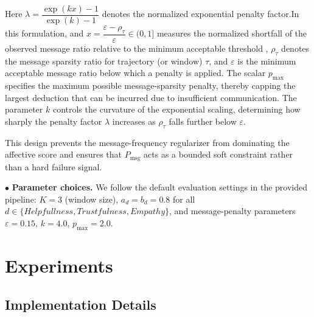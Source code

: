 \documentclass{article}
\theoremstyle{plain}
\theoremstyle{definition}
\theoremstyle{remark}
\begin{document}
Here $\lambda = \dfrac{\exp(kx)-1}{\exp(k)-1}$ denotes the normalized exponential penalty factor.In this formulation, and $x=\dfrac{\varepsilon-\rho_{\tau}}{\varepsilon}\in(0,1]$ measures the normalized shortfall of the observed message ratio relative to the minimum acceptable threshold
, $\rho_{\tau}$ denotes the message sparsity ratio for trajectory (or window) $\tau$, and $\varepsilon$ is the minimum acceptable message ratio below which a penalty is applied. The scalar $p_{\max}$ specifies the maximum possible message-sparsity penalty, thereby capping the largest deduction that can be incurred due to insufficient communication. The parameter $k$ controls the curvature of the exponential scaling, determining how sharply the penalty factor $\lambda$ increases as $\rho_{\tau}$ falls further below $\varepsilon$.

This design prevents the message-frequency regularizer from dominating the affective score and ensures that $P_{\mathrm{msg}}$ acts as a bounded soft constraint rather than a hard failure signal.


$\bullet$ \textbf{Parameter choices.}
We follow the default evaluation settings in the provided pipeline:
$K{=}3$ (window size), $a_d{=}b_d{=}0.8$ for all $d \in \{Helpfullness,Trustfulness,Empathy\}$, and message-penalty parameters
$\varepsilon{=}0.15$, $k{=}4.0$, $p_{\max}{=}2.0$.

\section{Experiments}

\subsection{Implementation Details}\label{appx:imp}
\end{document}
